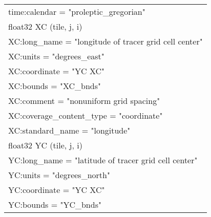 \begin{longtable}{|p{\textwidth}|}
\rowcolor{Apricot}\hspace{0.5cm}\hspace{0.5cm}time:calendar = "proleptic\_gregorian"\\
\rowcolor{Apricot}\hspace{0.5cm}float32 XC (tile, j, i)\\
\rowcolor{Apricot}\hspace{0.5cm}\hspace{0.5cm}XC:long\_name = "longitude of tracer grid cell center"\\
\rowcolor{Apricot}\hspace{0.5cm}\hspace{0.5cm}XC:units = "degrees\_east"\\
\rowcolor{Apricot}\hspace{0.5cm}\hspace{0.5cm}XC:coordinate = "YC XC"\\
\rowcolor{Apricot}\hspace{0.5cm}\hspace{0.5cm}XC:bounds = "XC\_bnds"\\
\rowcolor{Apricot}\hspace{0.5cm}\hspace{0.5cm}XC:comment = "nonuniform grid spacing"\\
\rowcolor{Apricot}\hspace{0.5cm}\hspace{0.5cm}XC:coverage\_content\_type = "coordinate"\\
\rowcolor{Apricot}\hspace{0.5cm}\hspace{0.5cm}XC:standard\_name = "longitude"\\
\rowcolor{Apricot}\hspace{0.5cm}float32 YC (tile, j, i)\\
\rowcolor{Apricot}\hspace{0.5cm}\hspace{0.5cm}YC:long\_name = "latitude of tracer grid cell center"\\
\rowcolor{Apricot}\hspace{0.5cm}\hspace{0.5cm}YC:units = "degrees\_north"\\
\rowcolor{Apricot}\hspace{0.5cm}\hspace{0.5cm}YC:coordinate = "YC XC"\\
\rowcolor{Apricot}\hspace{0.5cm}\hspace{0.5cm}YC:bounds = "YC\_bnds"\\

\end{longtable}

